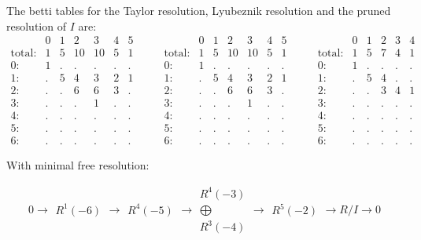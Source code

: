 \documentclass[paper=a4, fontsize=11pt]{scrartcl} %
\theoremstyle{plain}
\theoremstyle{definition}
\begin{document}
The betti tables for the Taylor resolution, Lyubeznik resolution and the pruned resolution of $I$ are:
$$
\begin{matrix}
& 0 & 1 & 2 & 3 & 4 & 5 \\
\text{total}: & 1 & 5 & 10 & 10 & 5 & 1 \\
0: & 1 & . & . & . & . & . \\
1: & . & 5 & 4 & 3 & 2 & 1 \\
2: & . & . & 6 & 6 & 3 & . \\
3: & . & . & . & 1 & . & . \\
4: & . & . & . & . & . & . \\
5: & . & . & . & . & . & . \\
6: & . & . & . & . & . & .
\end{matrix} \quad\quad
\begin{matrix}
& 0 & 1 & 2 & 3 & 4 & 5 \\
\text{total}: & 1 & 5 & 10 & 10 & 5 & 1 \\
0: & 1 & . & . & . & . & . \\
1: & . & 5 & 4 & 3 & 2 & 1 \\
2: & . & . & 6 & 6 & 3 & . \\
3: & . & . & . & 1 & . & . \\
4: & . & . & . & . & . & . \\
5: & . & . & . & . & . & . \\
6: & . & . & . & . & . & .
\end{matrix} \quad\quad
\begin{matrix}
& 0 & 1 & 2 & 3 & 4 \\
\text{total}: & 1 & 5 & 7 & 4 & 1 \\
0: & 1 & . & . & . & . \\
1: & . & 5 & 4 & . & . \\
2: & . & . & 3 & 4 & 1 \\
3: & . & . & . & . & . \\
4: & . & . & . & . & . \\
5: & . & . & . & . & . \\
6: & . & . & . & . & .
\end{matrix}
$$

With minimal free resolution:

$$0 \rightarrow \begin{matrix}
R^{1}(-6)
\end{matrix}
\rightarrow\begin{matrix}
R^{4}(-5)
\end{matrix}
\rightarrow\begin{matrix}
R^{4}(-3)\\ \bigoplus \\
R^{3}(-4)
\end{matrix}
\rightarrow\begin{matrix}
R^{5}(-2)
\end{matrix}
\rightarrow R/I \rightarrow 0$$
\end{document}
